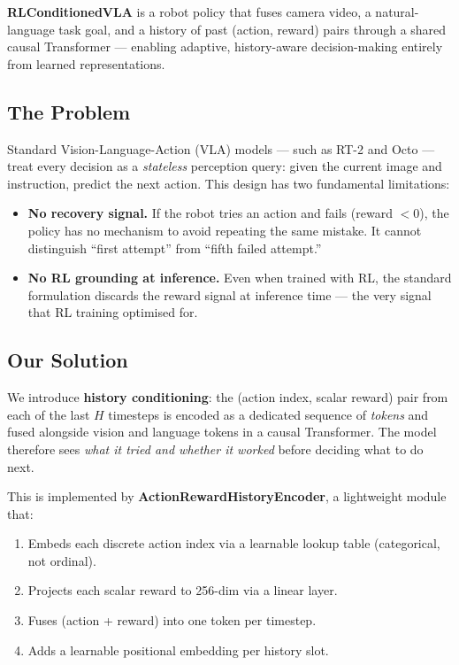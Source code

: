 \documentclass[12pt, a4paper]{article}
\begin{document}
\vspace{6pt}

\begin{infobox}
\textbf{RLConditionedVLA} is a robot policy that fuses camera video,
a natural-language task goal, and a history of past (action, reward) pairs
through a shared causal Transformer — enabling adaptive, history-aware
decision-making entirely from learned representations.
\end{infobox}

\subsection*{The Problem}

Standard Vision-Language-Action (VLA) models — such as RT-2 and Octo —
treat every decision as a \emph{stateless} perception query:
given the current image and instruction, predict the next action.
This design has two fundamental limitations:

\begin{itemize}[leftmargin=1.5em, itemsep=2pt]
  \item \textbf{No recovery signal.} If the robot tries an action and fails
        (reward $< 0$), the policy has no mechanism to avoid repeating the
        same mistake. It cannot distinguish ``first attempt'' from ``fifth
        failed attempt.''
  \item \textbf{No RL grounding at inference.} Even when trained with RL, the
        standard formulation discards the reward signal at inference time —
        the very signal that RL training optimised for.
\end{itemize}

\subsection*{Our Solution}

We introduce \textbf{history conditioning}: the (action index, scalar reward)
pair from each of the last $H$ timesteps is encoded as a dedicated sequence of
\emph{tokens} and fused alongside vision and language tokens in a causal
Transformer.
The model therefore sees \emph{what it tried and whether it worked} before
deciding what to do next.

This is implemented by \textbf{ActionRewardHistoryEncoder}, a lightweight
module that:
\begin{enumerate}[leftmargin=1.5em, itemsep=2pt]
  \item Embeds each discrete action index via a learnable lookup table
        (categorical, not ordinal).
  \item Projects each scalar reward to 256-dim via a linear layer.
  \item Fuses (action + reward) into one token per timestep.
  \item Adds a learnable positional embedding per history slot.
\end{enumerate}
\end{document}
